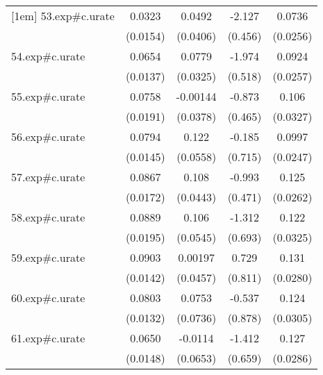 {\begin{tabular}{l*{4}{c}}
[1em]
53.exp#c.urate&      0.0323\sym{*}  &      0.0492         &      -2.127\sym{***}&      0.0736\sym{**} \\
            &    (0.0154)         &    (0.0406)         &     (0.456)         &    (0.0256)         \\
[1em]
54.exp#c.urate&      0.0654\sym{***}&      0.0779\sym{*}  &      -1.974\sym{***}&      0.0924\sym{***}\\
            &    (0.0137)         &    (0.0325)         &     (0.518)         &    (0.0257)         \\
[1em]
55.exp#c.urate&      0.0758\sym{***}&    -0.00144         &      -0.873         &       0.106\sym{**} \\
            &    (0.0191)         &    (0.0378)         &     (0.465)         &    (0.0327)         \\
[1em]
56.exp#c.urate&      0.0794\sym{***}&       0.122\sym{*}  &      -0.185         &      0.0997\sym{***}\\
            &    (0.0145)         &    (0.0558)         &     (0.715)         &    (0.0247)         \\
[1em]
57.exp#c.urate&      0.0867\sym{***}&       0.108\sym{*}  &      -0.993\sym{*}  &       0.125\sym{***}\\
            &    (0.0172)         &    (0.0443)         &     (0.471)         &    (0.0262)         \\
[1em]
58.exp#c.urate&      0.0889\sym{***}&       0.106         &      -1.312         &       0.122\sym{***}\\
            &    (0.0195)         &    (0.0545)         &     (0.693)         &    (0.0325)         \\
[1em]
59.exp#c.urate&      0.0903\sym{***}&     0.00197         &       0.729         &       0.131\sym{***}\\
            &    (0.0142)         &    (0.0457)         &     (0.811)         &    (0.0280)         \\
[1em]
60.exp#c.urate&      0.0803\sym{***}&      0.0753         &      -0.537         &       0.124\sym{***}\\
            &    (0.0132)         &    (0.0736)         &     (0.878)         &    (0.0305)         \\
[1em]
61.exp#c.urate&      0.0650\sym{***}&     -0.0114         &      -1.412\sym{*}  &       0.127\sym{***}\\
            &    (0.0148)         &    (0.0653)         &     (0.659)         &    (0.0286)         \\

\end{tabular}}
